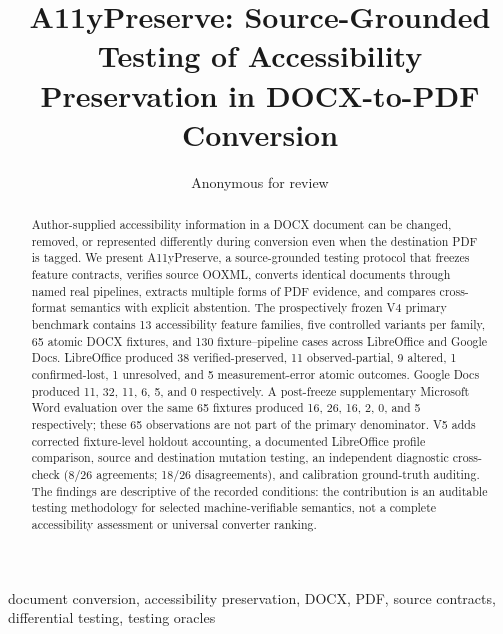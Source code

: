 \documentclass[conference]{IEEEtran}
\title{A11yPreserve: Source-Grounded Testing of Accessibility Preservation in DOCX-to-PDF Conversion}
\author{Anonymous for review}
\begin{document}
\maketitle

\begin{abstract}
Author-supplied accessibility information in a DOCX document can be changed, removed, or represented differently during conversion even when the destination PDF is tagged. We present A11yPreserve, a source-grounded testing protocol that freezes feature contracts, verifies source OOXML, converts identical documents through named real pipelines, extracts multiple forms of PDF evidence, and compares cross-format semantics with explicit abstention. The prospectively frozen V4 primary benchmark contains 13 accessibility feature families, five controlled variants per family, 65 atomic DOCX fixtures, and 130 fixture--pipeline cases across LibreOffice and Google Docs. LibreOffice produced 38 verified-preserved, 11 observed-partial, 9 altered, 1 confirmed-lost, 1 unresolved, and 5 measurement-error atomic outcomes. Google Docs produced 11, 32, 11, 6, 5, and 0 respectively. A post-freeze supplementary Microsoft Word evaluation over the same 65 fixtures produced 16, 26, 16, 2, 0, and 5 respectively; these 65 observations are not part of the primary denominator. V5 adds corrected fixture-level holdout accounting, a documented LibreOffice profile comparison, source and destination mutation testing, an independent diagnostic cross-check (8/26 agreements; 18/26 disagreements), and calibration ground-truth auditing. The findings are descriptive of the recorded conditions: the contribution is an auditable testing methodology for selected machine-verifiable semantics, not a complete accessibility assessment or universal converter ranking.
\end{abstract}

\begin{IEEEkeywords}
document conversion, accessibility preservation, DOCX, PDF, source contracts, differential testing, testing oracles
\end{IEEEkeywords}










\end{document}
